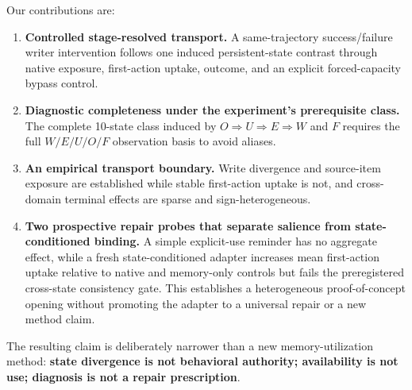 Our contributions are:
\begin{enumerate}
    \item \textbf{Controlled stage-resolved transport.} A same-trajectory success/failure writer intervention follows one induced persistent-state contrast through native exposure, first-action uptake, outcome, and an explicit forced-capacity bypass control.
    \item \textbf{Diagnostic completeness under the experiment's prerequisite class.} The complete 10-state class induced by $O\Rightarrow U\Rightarrow E\Rightarrow W$ and $F$ requires the full $W/E/U/O/F$ observation basis to avoid aliases.
    \item \textbf{An empirical transport boundary.} Write divergence and source-item exposure are established while stable first-action uptake is not, and cross-domain terminal effects are sparse and sign-heterogeneous.
    \item \textbf{Two prospective repair probes that separate salience from state-conditioned binding.} A simple explicit-use reminder has no aggregate effect, while a fresh state-conditioned adapter increases mean first-action uptake relative to native and memory-only controls but fails the preregistered cross-state consistency gate. This establishes a heterogeneous proof-of-concept opening without promoting the adapter to a universal repair or a new method claim.
\end{enumerate}

The resulting claim is deliberately narrower than a new memory-utilization method: \textbf{state divergence is not behavioral authority; availability is not use; diagnosis is not a repair prescription}.

